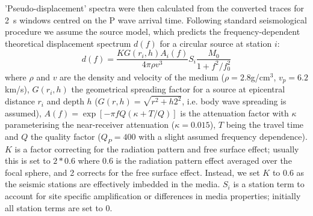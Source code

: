 \documentclass[reviewcopy]{elsarticle}
\begin{document}
'Pseudo-displacement' spectra were then calculated from the converted traces for 2~s windows
centred on the P wave arrival time.  Following standard seismological
procedure we assume the \citep{brune70} source model, which predicts
the frequency-dependent theoretical displacement spectrum $d(f)$ for a circular source at
station $i$:
\begin{equation}
d(f)=\frac{K G(r_i,h) A_i(f)}{4 \pi \rho v^3} S_i \frac{M_0}{1+f^2/f_0^2}
\end{equation}
where $\rho$ and $v$ are the density and velocity of the medium
($\rho=2.8$g/cm$^3$, $v_p=6.2$km/s), $G(r_i,h)$ the geometrical
spreading factor for a source at epicentral distance $r_i$ and depth
$h$ ($G(r,h)=\sqrt{r^2+h2^2}$, i.e. body wave spreading is assumed),
$A(f)=\exp[-\pi f Q (\kappa + T / Q)]$ is the attenuation factor with
$\kappa$ parameterising the near-receiver attenuation ($\kappa=0.015$),
$T$ being the travel time and $Q$ the quality factor ($Q_P=400$ with a
slight assumed frequency dependence). $K$ is a factor correcting for the
radiation pattern and free surface effect; usually this is set to
$2*0.6$ where 0.6 is the radiation pattern effect averaged over the
focal sphere, and 2 corrects for the free surface effect.  Instead, we
set $K$ to 0.6 as the seismic stations are effectively imbedded in the
media. $S_i$ is a station term to account for site specific
amplification or differences in media properties; initially all
station terms are set to 0.
\end{document}
